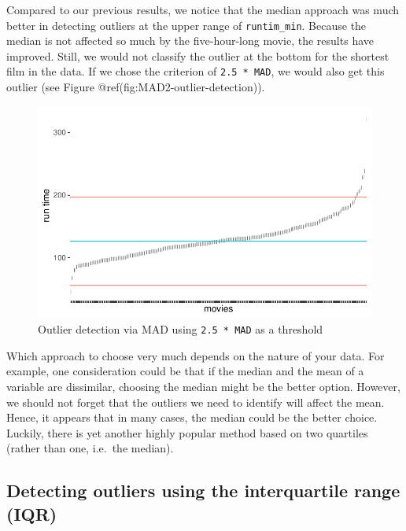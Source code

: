 \documentclass[
  letterpaper,
]{krantz}
\begin{document}
Compared to our previous results, we notice that the median approach was
much better in detecting outliers at the upper range of
\texttt{runtim\_min}. Because the median is not affected so much by the
five-hour-long movie, the results have improved. Still, we would not
classify the outlier at the bottom for the shortest film in the data. If
we chose the criterion of \texttt{2.5\ *\ MAD}, we would also get this
outlier (see Figure @ref(fig:MAD2-outlier-detection)).

\begin{figure}[H]

{\centering \includegraphics{09_sources_of_bias_files/figure-pdf/MAD2-outlier-detection-1.pdf}

}

\caption{Outlier detection via MAD using \texttt{2.5\ *\ MAD} as a
threshold}

\end{figure}%

Which approach to choose very much depends on the nature of your data.
For example, one consideration could be that if the median and the mean
of a variable are dissimilar, choosing the median might be the better
option. However, we should not forget that the outliers we need to
identify will affect the mean. Hence, it appears that in many cases, the
median could be the better choice. Luckily, there is yet another highly
popular method based on two quartiles (rather than one, i.e.~the
median).

\subsection{Detecting outliers using the interquartile range
(IQR)}\label{sec-outliers-iqr}
\end{document}
